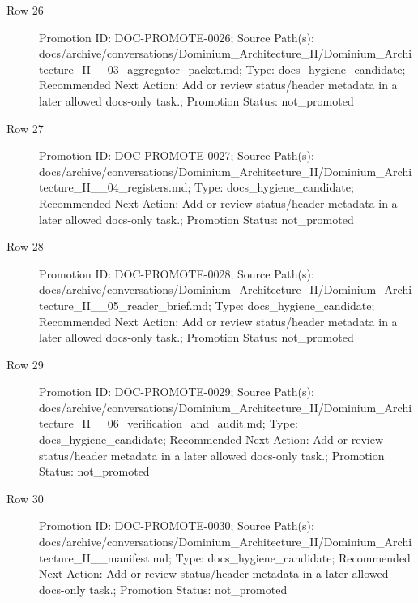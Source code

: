 \documentclass[10.5pt,a4paper,openany]{book}
\begin{document}
\begin{description}
\item[Row 26] Promotion ID: DOC-\allowbreak{}PROMOTE-\allowbreak{}0026; Source Path(s): docs/\allowbreak{}archive/\allowbreak{}conversations/\allowbreak{}Dominium\_\allowbreak{}Architecture\_\allowbreak{}II/\allowbreak{}Dominium\_\allowbreak{}Architecture\_\allowbreak{}II\_\allowbreak{}\_\allowbreak{}03\_\allowbreak{}aggregator\_\allowbreak{}packet.\allowbreak{}md; Type: docs\_\allowbreak{}hygiene\_\allowbreak{}candidate; Recommended Next Action: Add or review status/\allowbreak{}header metadata in a later allowed docs-\allowbreak{}only task.\allowbreak{}; Promotion Status: not\_\allowbreak{}promoted
\item[Row 27] Promotion ID: DOC-\allowbreak{}PROMOTE-\allowbreak{}0027; Source Path(s): docs/\allowbreak{}archive/\allowbreak{}conversations/\allowbreak{}Dominium\_\allowbreak{}Architecture\_\allowbreak{}II/\allowbreak{}Dominium\_\allowbreak{}Architecture\_\allowbreak{}II\_\allowbreak{}\_\allowbreak{}04\_\allowbreak{}registers.\allowbreak{}md; Type: docs\_\allowbreak{}hygiene\_\allowbreak{}candidate; Recommended Next Action: Add or review status/\allowbreak{}header metadata in a later allowed docs-\allowbreak{}only task.\allowbreak{}; Promotion Status: not\_\allowbreak{}promoted
\item[Row 28] Promotion ID: DOC-\allowbreak{}PROMOTE-\allowbreak{}0028; Source Path(s): docs/\allowbreak{}archive/\allowbreak{}conversations/\allowbreak{}Dominium\_\allowbreak{}Architecture\_\allowbreak{}II/\allowbreak{}Dominium\_\allowbreak{}Architecture\_\allowbreak{}II\_\allowbreak{}\_\allowbreak{}05\_\allowbreak{}reader\_\allowbreak{}brief.\allowbreak{}md; Type: docs\_\allowbreak{}hygiene\_\allowbreak{}candidate; Recommended Next Action: Add or review status/\allowbreak{}header metadata in a later allowed docs-\allowbreak{}only task.\allowbreak{}; Promotion Status: not\_\allowbreak{}promoted
\item[Row 29] Promotion ID: DOC-\allowbreak{}PROMOTE-\allowbreak{}0029; Source Path(s): docs/\allowbreak{}archive/\allowbreak{}conversations/\allowbreak{}Dominium\_\allowbreak{}Architecture\_\allowbreak{}II/\allowbreak{}Dominium\_\allowbreak{}Architecture\_\allowbreak{}II\_\allowbreak{}\_\allowbreak{}06\_\allowbreak{}verification\_\allowbreak{}and\_\allowbreak{}audit.\allowbreak{}md; Type: docs\_\allowbreak{}hygiene\_\allowbreak{}candidate; Recommended Next Action: Add or review status/\allowbreak{}header metadata in a later allowed docs-\allowbreak{}only task.\allowbreak{}; Promotion Status: not\_\allowbreak{}promoted
\item[Row 30] Promotion ID: DOC-\allowbreak{}PROMOTE-\allowbreak{}0030; Source Path(s): docs/\allowbreak{}archive/\allowbreak{}conversations/\allowbreak{}Dominium\_\allowbreak{}Architecture\_\allowbreak{}II/\allowbreak{}Dominium\_\allowbreak{}Architecture\_\allowbreak{}II\_\allowbreak{}\_\allowbreak{}manifest.\allowbreak{}md; Type: docs\_\allowbreak{}hygiene\_\allowbreak{}candidate; Recommended Next Action: Add or review status/\allowbreak{}header metadata in a later allowed docs-\allowbreak{}only task.\allowbreak{}; Promotion Status: not\_\allowbreak{}promoted

\end{description}
\end{document}
